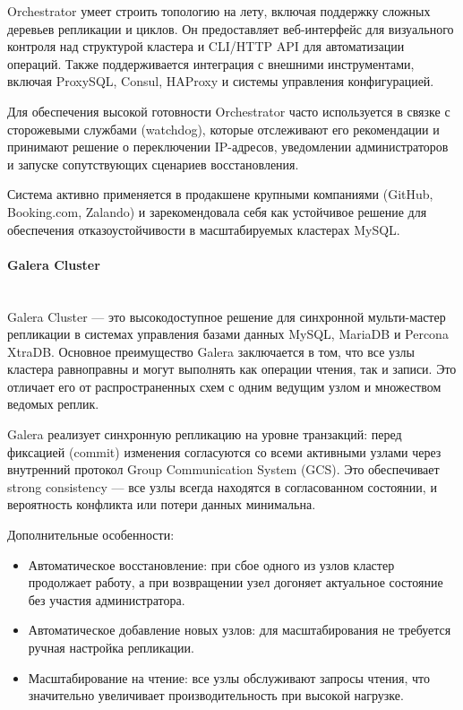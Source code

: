 Orchestrator умеет строить топологию на лету, включая поддержку сложных деревьев репликации и циклов. Он предоставляет веб-интерфейс для визуального контроля над структурой кластера и CLI/HTTP API для автоматизации операций. Также поддерживается интеграция с внешними инструментами, включая ProxySQL, Consul, HAProxy и системы управления конфигурацией.

Для обеспечения высокой готовности Orchestrator часто используется в связке с сторожевыми службами (watchdog), которые отслеживают его рекомендации и принимают решение о переключении IP-адресов, уведомлении администраторов и запуске сопутствующих сценариев восстановления.

Система активно применяется в продакшене крупными компаниями (GitHub, Booking.com, Zalando) и зарекомендовала себя как устойчивое решение для обеспечения отказоустойчивости в масштабируемых кластерах MySQL.

\paragraph{Galera Cluster} ~\\
Galera Cluster — это высокодоступное решение для синхронной мульти-мастер репликации в системах управления базами данных MySQL, MariaDB и Percona XtraDB. Основное преимущество Galera заключается в том, что все узлы кластера равноправны и могут выполнять как операции чтения, так и записи. Это отличает его от распространенных схем с одним ведущим узлом и множеством ведомых реплик. \autocite{GaleraCl}

Galera реализует синхронную репликацию на уровне транзакций: перед фиксацией (commit) изменения согласуются со всеми активными узлами через внутренний протокол Group Communication System (GCS). Это обеспечивает strong consistency — все узлы всегда находятся в согласованном состоянии, и вероятность конфликта или потери данных минимальна.

Дополнительные особенности:
\begin{itemize}
    \item Автоматическое восстановление: при сбое одного из узлов кластер продолжает работу, а при возвращении узел догоняет актуальное состояние без участия администратора.
    \item Автоматическое добавление новых узлов: для масштабирования не требуется ручная настройка репликации.
    \item Масштабирование на чтение: все узлы обслуживают запросы чтения, что значительно увеличивает производительность при высокой нагрузке.
\end{itemize}

